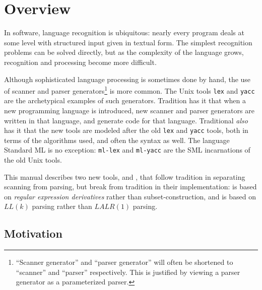 \chapter{Overview}\label{chap:overview}

In software, language recognition is ubiquitous: nearly every program deals at some level with structured input given in textual form.  The simplest recognition problems can be solved directly, but as the complexity of the language grows, recognition and processing become more difficult.  

Although sophisticated language processing is sometimes done by hand, the use of scanner and parser generators\footnote{
  ``Scanner generator'' and ``parser generator'' will often be shortened to ``scanner'' and ``parser'' respectively.  This is justified by viewing a parser generator as a parameterized parser.
} is more common.  The Unix tools {\tt lex} and {\tt yacc} are the archetypical examples of such generators.  Tradition has it that when a new programming language is introduced, new scanner and parser generators are written in that language, and generate code for that language.  Traditional \emph{also} has it that the new tools are modeled after the old {\tt lex} and {\tt yacc} tools, both in terms of the algorithms used, and often the syntax as well.  The language Standard ML is no exception: {\tt ml-lex} and {\tt ml-yacc} are the SML incarnations of the old Unix tools.

This manual describes two new tools, \ulex{} and \mlantlr{}, that follow tradition in separating scanning from parsing, but break from tradition in their implementation: \ulex{} is based on \emph{regular expression derivatives} rather than subset-construction, and \mlantlr{} is based on $LL(k)$ parsing rather than $LALR(1)$ parsing.   

\section{Motivation}

